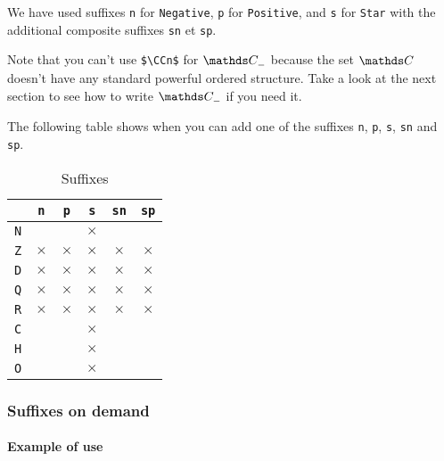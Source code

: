 \documentclass[12pt,a4paper]{article}
\theoremstyle{definition}
\begin{document}
We have used suffixes \verb+n+ for \verb+Negative+, \verb+p+ for \verb+Positive+, and \verb+s+ for \verb+Star+ with the additional composite suffixes \verb+sn+ et \verb+sp+.

\medskip

Note that you can't use \verb+$\CCn$+ for $\specialset{\CC}{n}$ because the set $\CC$ doesn't have any standard powerful ordered structure. Take a look at the next section to see how to write $\specialset{\CC}{n}$ if you need it.

\medskip

The following table shows when you can add one of the suffixes \verb+n+, \verb+p+, \verb+s+, \verb+sn+ and \verb+sp+.

\newcommand\xx{\phantom{$\times$}}
\begin{table}[h]
    \caption{Suffixes}
    \begin{center}
        \begin{tabular}{c|c|c|c|c|c}
  & \verb+n+ & \verb+p+ & \verb+s+ & \verb+sn+ & \verb+sp+ \\
\hline \verb+N+ & \xx & \xx & $\times$ & \xx & \xx \\
\hline \verb+Z+ & $\times$ & $\times$ & $\times$ & $\times$ & $\times$ \\
\hline \verb+D+ & $\times$ & $\times$ & $\times$ & $\times$ & $\times$ \\
\hline \verb+Q+ & $\times$ & $\times$ & $\times$ & $\times$ & $\times$ \\
\hline \verb+R+ & $\times$ & $\times$ & $\times$ & $\times$ & $\times$ \\
\hline \verb+C+ & \xx & \xx & $\times$ & \xx & \xx \\
\hline \verb+H+ & \xx & \xx & $\times$ & \xx & \xx \\
\hline \verb+O+ & \xx & \xx & $\times$ & \xx & \xx \\
        \end{tabular}
    \end{center}
    \label{default}
\end{table}



    \subsubsection{Suffixes on demand}

        \paragraph{Example of use}
\end{document}
